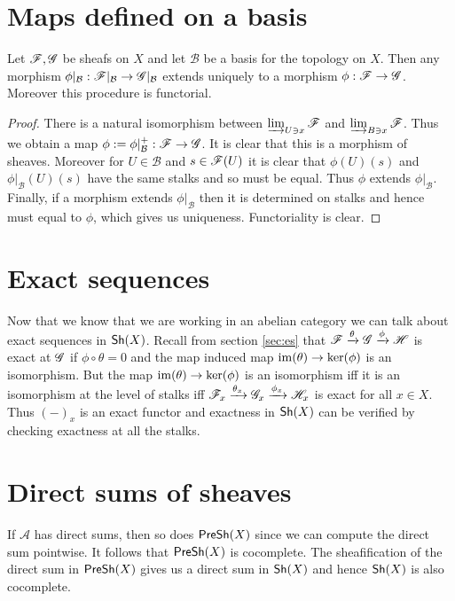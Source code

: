 \documentclass{memoir}
\begin{document}
\section{Maps defined on a basis}
\begin{thm}
    Let $\mathscr{F},\mathscr{G}$ be sheafs on $X$ and let $\mathcal B$ be a basis for the topology on $X$.
    Then any morphism $\phi|_{\mathcal B}:\mathscr{F}|_{\mathcal B} \to \mathscr{G}|_{\mathcal B}$ extends uniquely to a morphism $\phi:\mathscr{F}\to \mathscr{G}$.
    Moreover this procedure is functorial.
\end{thm}
\begin{proof}
    There is a natural isomorphism between $\varinjlim_{U\ni x}\mathscr{F}$ and $\varinjlim_{B\ni x}\mathscr{F}$. 
    Thus we obtain a map $\phi:=\phi|_{\mathcal B}^+:\mathscr{F}\to \mathscr{G}$.
    It is clear that this is a morphism of sheaves.
    Moreover for $U\in\mathcal B$ and $s\in\mathscr{F}(U)$ it is clear that $\phi(U)(s)$ and $\phi|_{\mathcal B}(U)(s)$ have the same stalks and so must be equal.
    Thus $\phi$ extends $\phi|_{\mathcal B}$.
    Finally, if a morphism extends $\phi|_{\mathcal B}$ then it is determined on stalks and hence must equal to $\phi$, which gives us uniqueness.
    Functoriality is clear.
\end{proof}
\section{Exact sequences}
Now that we know that we are working in an abelian category we can talk about exact sequences in ${\normalfont\mathsf{Sh}}(X)$.
Recall from section \ref{sec:es} that $\mathscr{F}\xrightarrow{\theta}\mathscr{G}\xrightarrow{\phi}\mathscr{H}$ is exact at $\mathscr{G}$ if $\phi\circ\theta=0$ and the map induced map $\operatorname{im}(\theta)\to\ker(\phi)$ is an isomorphism.
But the map $\operatorname{im}(\theta)\to\ker(\phi)$ is an isomorphism iff it is an isomorphism at the level of stalks iff $\mathscr{F}_x\xrightarrow{\theta_x}\mathscr{G}_x\xrightarrow{\phi_x}\mathscr{H}_x$ is exact for all $x\in X$.
Thus $(-)_x$ is an exact functor and exactness in ${\normalfont\mathsf{Sh}}(X)$ can be verified by checking exactness at all the stalks.
\section{Direct sums of sheaves}
If $\mathcal A$ has direct sums, then so does ${\normalfont\mathsf{PreSh}}(X)$ since we can compute the direct sum pointwise.
It follows that ${\normalfont\mathsf{PreSh}}(X)$ is cocomplete.
The sheafification of the direct sum in ${\normalfont\mathsf{PreSh}}(X)$ gives us a direct sum in ${\normalfont\mathsf{Sh}}(X)$ and hence ${\normalfont\mathsf{Sh}}(X)$ is also cocomplete.
\end{document}
